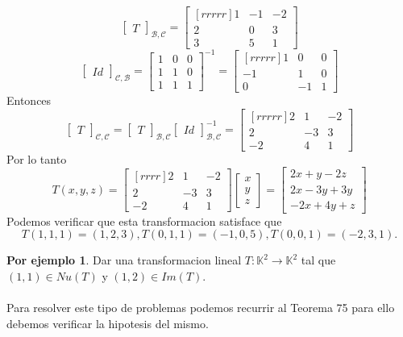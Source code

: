 \documentclass{article}
\theoremstyle{definition}
\theoremstyle{definition}
\newtheorem*{ej}{Por ejemplo}
\theoremstyle{remark}
\begin{document}
\[
  \begin{bmatrix}T\end{bmatrix}_{\mathcal{B,C}}=\begin{bmatrix}[rrrrr]1 & -1 & -2 \\ 2 & 0 & 3 \\ 3 & 5 & 1 \end{bmatrix}
\]
\[
  \begin{bmatrix}Id\end{bmatrix}_{\mathcal{C,B}}=\begin{bmatrix}1 & 0 & 0 \\ 1 & 1 & 0 \\ 1 & 1 & 1 \end{bmatrix}^{-1}=\begin{bmatrix}[rrrrr]1 & 0 & 0 \\ -1 & 1 & 0 \\ 0 & -1 & 1 \end{bmatrix} 
\]
Entonces \[
  \begin{bmatrix}T\end{bmatrix}_{\mathcal{C,C}}=\begin{bmatrix}T\end{bmatrix}_{\mathcal{B,C}}\begin{bmatrix}Id\end{bmatrix}_{\mathcal{B,C}}^{-1}=\begin{bmatrix}[rrrrr]2 & 1 & -2 \\ 2 & -3 & 3 \\ -2 & 4 & 1 \end{bmatrix}
\]
Por lo tanto \[
  T(x,y,z)=\begin{bmatrix}[rrrr]2 & 1 & -2 \\ 2 & -3 & 3 \\ -2 & 4 & 1 \end{bmatrix}\begin{bmatrix}x \\ y \\ z \end{bmatrix}= \begin{bmatrix}2x+y-2z \\2x-3y+3y \\ -2x+4y+z \end{bmatrix}
\]
Podemos verificar que esta transformacion satisface que \[
T(1,1,1)=(1,2,3),T(0,1,1)=(-1,0,5),T(0,0,1)=(-2,3,1).
\]
\begin{ej}
Dar una transformacion lineal $T : \mathbb{K}^2 \to \mathbb{K}^2$ tal que \\ $(1,1) \in Nu(T)$ y $(1,2) \in Im(T)$. \\\\
Para resolver este tipo de problemas podemos recurrir al Teorema 75 para ello debemos verificar la hipotesis del mismo.
\end{ej}
\end{document}
